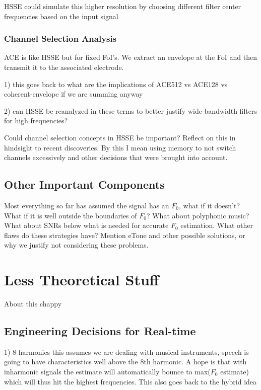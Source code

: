 \documentclass [11pt, proquest] {uwthesis}[2015/03/03]
\begin{document}
HSSE could simulate this higher resolution by choosing different filter center frequencies based on the input signal

\subsection{Channel Selection Analysis}

ACE is like HSSE but for fixed FoI's.  We extract an envelope at the FoI and then transmit it to the associated electrode.

1) this goes back to what are the implications of ACE512 vs ACE128 vs coherent-envelope if we are summing anyway

2) can HSSE be reanalyzed in these terms to better justify wide-bandwidth filters for high frequencies?

Could channel selection concepts in HSSE be important?  Reflect on this in hindsight to recent discoveries.  By this I mean using memory to not switch channels excessively and other decisions that were brought into account.

\section{Other Important Components}

Most everything so far has assumed the signal has an $F_0$, what if it doesn't?  What if it is well outside the boundaries of $F_0$?  What about polyphonic music?  What about SNRs below what is needed for accurate $F_0$ estimation.  What other flaws do these strategies have?  Mention eTone and other possible solutions, or why we justify not considering these problems.


 
\chapter{Less Theoretical Stuff}

About this chappy

\section{Engineering Decisions for Real-time}

1) 8 harmonics
this assumes we are dealing with musical instruments, speech is going to have characteristics well above the 8th harmonic.  A hope is that with inharmonic signals the estimate will automatically bounce to max($F_0$ estimate) which will thus hit the highest frequencies.  This also goes back to the hybrid idea
\end{document}
